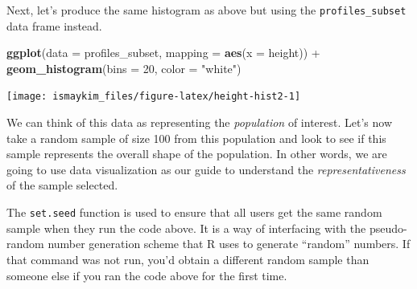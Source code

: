 \documentclass[]{tufte-book}
\newenvironment{Shaded}{\begin{snugshade}}{\end{snugshade}}
\newcommand{\KeywordTok}[1]{\textcolor[rgb]{0.13,0.29,0.53}{\textbf{{#1}}}}
\newcommand{\DataTypeTok}[1]{\textcolor[rgb]{0.13,0.29,0.53}{{#1}}}
\newcommand{\DecValTok}[1]{\textcolor[rgb]{0.00,0.00,0.81}{{#1}}}
\newcommand{\StringTok}[1]{\textcolor[rgb]{0.31,0.60,0.02}{{#1}}}
\newcommand{\OtherTok}[1]{\textcolor[rgb]{0.56,0.35,0.01}{{#1}}}
\newcommand{\NormalTok}[1]{{#1}}
\begin{document}
\begin{Shaded}
\end{Shaded}

Next, let's produce the same histogram as above but using the
\texttt{profiles\_subset} data frame instead.

\begin{Shaded}
\begin{Highlighting}[]
\KeywordTok{ggplot}\NormalTok{(}\DataTypeTok{data =} \NormalTok{profiles_subset, }\DataTypeTok{mapping =} \KeywordTok{aes}\NormalTok{(}\DataTypeTok{x =} \NormalTok{height)) +}
\StringTok{  }\KeywordTok{geom_histogram}\NormalTok{(}\DataTypeTok{bins =} \DecValTok{20}\NormalTok{, }\DataTypeTok{color =} \StringTok{"white"}\NormalTok{)}
\end{Highlighting}
\end{Shaded}

\begin{center}\texttt{[image: ismaykim\_files/figure-latex/height-hist2-1]} \end{center}

We can think of this data as representing the \emph{population} of
interest. Let's now take a random sample of size 100 from this
population and look to see if this sample represents the overall shape
of the population. In other words, we are going to use data
visualization as our guide to understand the \emph{representativeness}
of the sample selected.

\begin{Shaded}
\end{Shaded}

The \texttt{set.seed} function is used to ensure that all users get the
same random sample when they run the code above. It is a way of
interfacing with the pseudo-random number generation scheme that R uses
to generate ``random'' numbers. If that command was not run, you'd
obtain a different random sample than someone else if you ran the code
above for the first time.
\end{document}
